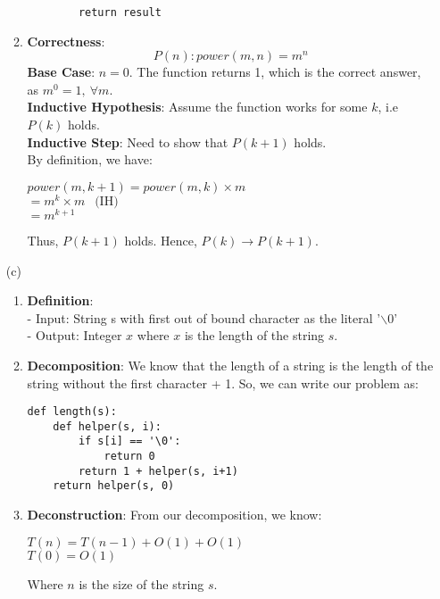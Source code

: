 \documentclass[a4paper]{article}
\begin{document}
\begin{enumerate}
\begin{enumerate}[label=\roman*]
\begin{verbatim}
        return result
\end{verbatim}

\item \textbf{Correctness}:
$$P(n): power(m, n) = m^n$$
\textbf{Base Case}: $n = 0$. The function returns 1, which is the correct answer, as $m^0 = 1,\ \forall m$. \\
\textbf{Inductive Hypothesis}: Assume the function works for some $k$, i.e $P(k)$ holds.\\
\textbf{Inductive Step}: Need to show that $P(k+1)$ holds.\\
By definition, we have:
\begin{center}
    $power(m, k+1) = power(m, k) \times m$\\
    $= m^k \times m\ \ \text{ (IH)}$ \\
    $= m^{k+1}$
\end{center}
Thus, $P(k+1)$ holds. Hence, $P(k) \rightarrow P(k+1)$.\\
\end{enumerate}
(c)
\begin{enumerate}[label=\roman*]
    \item \textbf{Definition}:\\
    - Input: String s with first out of bound character as the literal '$\backslash 0$' \\
    - Output: Integer $x$ where $x$ is the length of the string $s$.

    \item \textbf{Decomposition}: We know that the length of a string is the length of the string without the first character + 1. So, we can write our problem as:
\begin{verbatim}
def length(s):
    def helper(s, i):
        if s[i] == '\0':
            return 0
        return 1 + helper(s, i+1)
    return helper(s, 0)
\end{verbatim}

\item \textbf{Deconstruction}: From our decomposition, we know:
\begin{center}
    $T(n) = T(n-1) + O(1) +O(1)$\\
    $T(0) = O(1)$
\end{center}
Where $n$ is the size of the string $s$.


\end{enumerate}
\end{enumerate}
\end{document}
